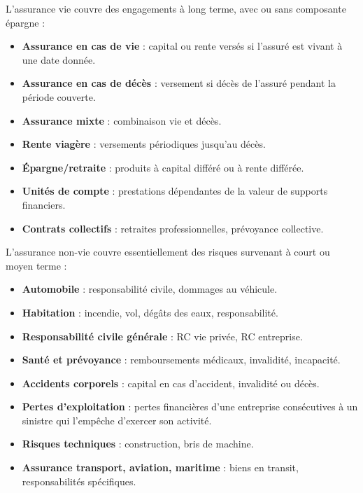 \begin{f}
	
	L’assurance vie couvre des engagements à long terme, avec ou sans composante épargne :
	\begin{itemize}[nosep]
		\item \textbf{Assurance en cas de vie} : capital ou rente versés si l’assuré est vivant à une date donnée.
		\item \textbf{Assurance en cas de décès} : versement si décès de l’assuré pendant la période couverte.
		\item \textbf{Assurance mixte} : combinaison vie et décès.
		\item \textbf{Rente viagère} : versements périodiques jusqu’au décès.
		\item \textbf{Épargne/retraite} : produits à capital différé ou à rente différée.
		\item \textbf{Unités de compte} : prestations dépendantes de la valeur de supports financiers.
		\item \textbf{Contrats collectifs} : retraites professionnelles, prévoyance collective.
	\end{itemize}
	
	
	L’assurance non-vie couvre essentiellement des risques survenant à court ou moyen terme :
	\begin{itemize}[nosep]
		\item \textbf{Automobile} : responsabilité civile, dommages au véhicule.
		\item \textbf{Habitation} : incendie, vol, dégâts des eaux, responsabilité.
		\item \textbf{Responsabilité civile générale} : RC vie privée, RC entreprise.
		\item \textbf{Santé et prévoyance} : remboursements médicaux, invalidité, incapacité.
		\item \textbf{Accidents corporels} : capital en cas d’accident, invalidité ou décès.
		\item \textbf{Pertes d’exploitation} : pertes financières d'une entreprise consécutives à un sinistre qui l'empêche d'exercer son activité.
		\item \textbf{Risques techniques} : construction, bris de machine.
		\item \textbf{Assurance transport, aviation, maritime} : biens en transit, responsabilités spécifiques.
	\end{itemize}
	

\end{f}
